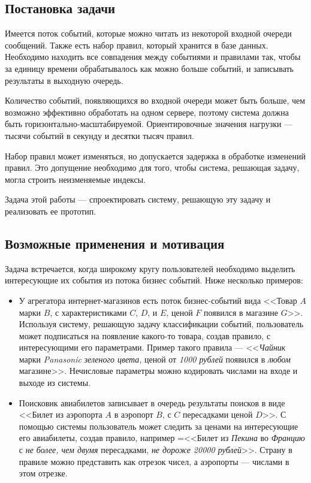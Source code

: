 \documentclass[14pt]{article}
\begin{document}
\subsection{Постановка задачи}
Имеется поток событий, которые можно читать из некоторой входной очереди сообщений. Также есть набор правил, который хранится в базе данных. Необходимо находить все совпадения между событиями и правилами так, чтобы за единицу времени обрабатывалось как можно больше событий, и записывать результаты в выходную очередь.

Количество событий, появляющихся во входной очереди может быть больше, чем возможно эффективно обработать на одном сервере, поэтому система должна быть горизонтально-масштабируемой. Ориентировочные значения нагрузки --- тысячи событий в секунду и десятки тысяч правил.

Набор правил может изменяться, но допускается задержка в обработке изменений правил. Это допущение необходимо для того, чтобы система, решающая задачу, могла строить неизменяемые индексы.

Задача этой работы --- спроектировать систему, решающую эту задачу и реализовать ее прототип.

\subsection{Возможные применения и мотивация}
Задача встречается, когда широкому кругу пользователей необходимо выделить интересующие их события из потока бизнес событий. Ниже несколько примеров:
\begin{itemize}
    \item У агрегатора интернет-магазинов есть поток бизнес-событий вида <<Товар $A$ марки $B$, с характеристиками $C$, $D$, и $E$, ценой $F$ появился в магазине $G$>>. Используя систему, решающую задачу классификации событий, пользователь может подписаться на появление какого-то товара, создав правило, с интересующими его параметрами. Пример такого правила --- <<\emph{Чайник} марки \emph{Panasonic} \emph{зеленого цвета}, ценой от \emph{1000 рублей} появился в \emph{любом} магазине>>. Нечисловые параметры можно кодировать числами на входе и выходе из системы.
    \item Поисковик авиабилетов записывает в очередь результаты поисков в виде <<Билет из аэропорта $A$ в аэропорт $B$, с $C$ пересадками ценой $D$>>. С помощью системы пользователь может следить за ценами на интересующие его авиабилеты, создав правило, например =<<Билет из \emph{Пекина} во \emph{Францию} с \emph{не более, чем двумя} пересадками, \emph{не дороже 20000 рублей}>>. Страну в правиле можно представить как отрезок чисел, а аэропорты --- числами в этом отрезке. 
\end{itemize}
\end{document}
